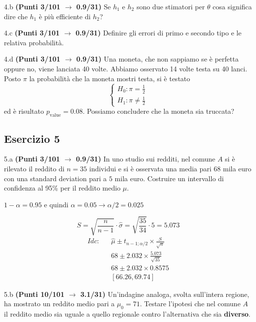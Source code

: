 \documentclass[
  11pt,
]{book}
\theoremstyle{mytheoremstyle}
\theoremstyle{mydefstyle}
\newenvironment{sol}
  {
  \begin{tcolorbox}[enhanced,breakable,arc=0.1mm,boxrule=1pt,colback=white,colframe=iblue,
  title=\bf \fontfamily{lmss}\selectfont \hspace{.5 cm} Soluzione,drop fuzzy shadow]

}{
\end{tcolorbox}
  }
\begin{document}
4.b \textbf{(Punti 3/101 \(\rightarrow\) 0.9/31)} Se \(h_1\) e \(h_2\) sono due stimatori per \(\theta\) cosa significa dire che \(h_1\) è più efficiente di \(h_2\)?

4.c \textbf{(Punti 3/101 \(\rightarrow\) 0.9/31)} Definire gli errori di primo e secondo tipo e le relativa probabilità.

4.d \textbf{(Punti 3/101 \(\rightarrow\) 0.9/31)} Una moneta, che non sappiamo se è perfetta oppure no, viene lanciata 40 volte. Abbiamo osservato 14 volte testa su 40 lanci. Posto \(\pi\) la probabilità che la moneta mostri testa, si è testato
\[
\begin{cases}
H_0:\pi=\frac 12\\
H_1:\pi\ne\frac 12
\end{cases}
\]
ed è risultato \(p_\text{value}=0.08\). Possiamo concludere che la moneta sia truccata?

\subsection{Esercizio 5}\label{esercizio-5-22}

5.a \textbf{(Punti 3/101 \(\rightarrow\) 0.9/31)} In uno studio sui redditi, nel comune \(A\) si è rilevato il reddito di \(n=35\) individui e si è osservata una media pari \(68\) mila euro con una standard deviation pari a \(5\) mila euro.
Costruire un intervallo di confidenza al 95\% per il reddito medio \(\mu\).

\begin{sol}
\(1-\alpha =0.95\) e quindi \(\alpha=0.05\rightarrow \alpha/2=0.025\)

\[
      S  =\sqrt{\frac {n}{n-1}}\cdot\hat\sigma =
     \sqrt{\frac { 35 }{ 34 }}\cdot 5 = 5.073 
\]
\begin{eqnarray*}
  Idc: & &  \hat\mu \pm  t_{n-1;\alpha/2} \times \frac{S}{\sqrt{n}} \\
     & &  68 \pm  2.032 \times \frac{ 5.073 }{\sqrt{ 35 }} \\
     & &  68 \pm  2.032 \times  0.8575 \\
     & & [ 66.26 ,  69.74 ]
\end{eqnarray*}

\end{sol}

5.b \textbf{(Punti 10/101 \(\rightarrow\) 3.1/31)} Un'indagine analoga, svolta sull'intera regione, ha mostrato un reddito medio pari a \(\mu_0=71\). Testare l'ipotesi che nel comune \(A\) il reddito medio sia uguale a quello regionale contro l'alternativa che sia \textbf{diverso}.
\end{document}
